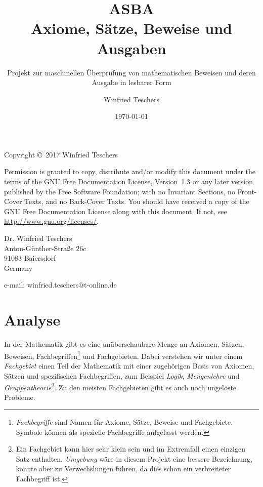 \documentclass[english,ngerman,parskip=half,headsepline,footsepline]{scrreprt}
\title{ASBA\\Axiome, Sätze, Beweise und Ausgaben}
\subtitle{Projekt zur maschinellen Überprüfung von mathematischen Beweisen und deren Ausgabe in lesbarer Form}
\author{Winfried Teschers}
\date{\today}
\begin{document}
	
	\maketitle
	
	\tableofcontents
	\thispagestyle{scrheadings}
	
	\vfill
	Copyright \copyright\ 2017 Winfried Teschers
	
	\vspace{12pt}
	Permission is granted to copy, distribute and/or modify this document under the terms of the GNU Free Documentation License, Version~1.3 or any later version published by the Free Software Foundation; with no Invariant Sections, no Front-Cover Texts, and no Back-Cover Texts. You should have received a copy of the GNU Free Documentation License along with this document.  If not, see \url{http://www.gnu.org/licenses/}.
	\vspace{12pt}
	
	Dr. Winfried Teschers\\
	Anton-Günther-Straße 26c\\
	91083 Baiersdorf\\
	Germany
	
	e-mail: winfried.teschers@t-online.de
		
	
	\chapter{Analyse}
	\ihead{\textsf{\textbf{\chaptername\ \thesection}}}
	\thispagestyle{scrheadings}
	
	In der Mathematik gibt es eine unüberschaubare Menge an Axiomen, Sätzen, Beweisen, Fachbegriffen\footnote{ \emph{Fachbegriffe} sind Namen für Axiome, Sätze, Beweise und Fachgebiete. Symbole können als spezielle Fachbegriffe aufgefasst werden.} und Fachgebieten. Dabei verstehen wir unter einem \emph{Fachgebiet} einen Teil der Mathematik  mit einer zugehörigen Basis von Axiomen, Sätzen und spezifischen Fachbegriffen, zum Beispiel \emph{Logik}, \emph{Mengenlehre} und \emph{Gruppentheorie}\footnote{ Ein Fachgebiet kann hier sehr klein sein und im Extremfall einen einzigen Satz enthalten. \emph{Umgebung} wäre in diesem Projekt eine bessere Bezeichnung, könnte aber zu Verwechslungen führen, da dies schon ein verbreiteter Fachbegriff ist.}. Zu den meisten Fachgebieten gibt es auch noch ungelöste Probleme.
	
\end{document}
